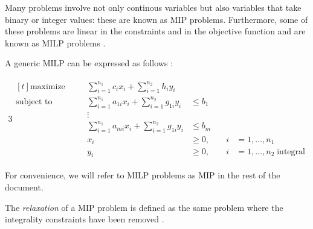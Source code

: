 Many problems involve not only continous variables but also variables that take binary or
integer values: these are known as \acrfull{MIP} problems. Furthermore, some of
these problems are linear in the constraints and in the objective function and are
known as \acrfull{MILP} problems
\cite{Edgar2001,Wolsey1998}.

A generic \acrshort{MILP} can be expressed as follows \cite{Conforti2016}:

\begin{alignat}{3}
	\label{eq:standard-form-milp}
	\begin{aligned}[t]
		\text{maximize}   &                                     & \sum_{i=1}^{n_{1} } c_{i}x_{i} +
		\sum_{i=1}^{n_{2} } h_{i}y_{i}                                                                                                                               \\
		\text{subject to} & \quad                               & \sum_{i=1}^{n_{1} } a_{1i}  x_{i} + \sum_{i=1}^{n_{2} } g_{1i}  y_{i} & \leq b_{1}       &         \\
		                  &                                     & \vdots                                                                                             \\
		                  &                                     & \sum_{i=1}^{n_{1} } a_{mi}  x_{i} + \sum_{i=1}^{n_{2} } g_{1i}  y_{i} & \leq b_{m}       &         \\
		                  &                                     & x_{i}
		                  & \geq 0,                             & \quad i                                                               & =1 ,\dots, n_{1}           \\
		                  &                                     & y_{i}                                                                 & \geq 0,          & \quad i
		                  & =1 ,\dots, n_{2} \; \text{integral}
	\end{aligned}
\end{alignat}

For convenience, we will refer to \acrshort{MILP} problems as \acrshort{MIP} in
the rest of the document.

The \emph{relaxation} of a \acrshort{MIP} problem is defined as the same
problem where the integrality constraints have been removed \cite{Edgar2001}.

